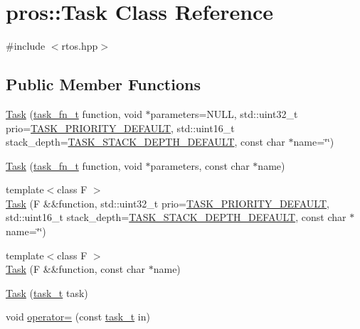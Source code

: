 \hypertarget{classpros_1_1Task}{}\section{pros\+:\+:Task Class Reference}
\label{classpros_1_1Task}


{\ttfamily \#include $<$rtos.\+hpp$>$}

\subsection*{Public Member Functions}
\begin{DoxyCompactItemize}
\item 
\hyperlink{classpros_1_1Task_a938ee60b49f29d743315bf05ee9f4a56}{Task} (\hyperlink{rtos_8h_aece0aa29b1f1538115228d2197239f98}{task\+\_\+fn\+\_\+t} function, void $\ast$parameters=N\+U\+LL, std\+::uint32\+\_\+t prio=\hyperlink{rtos_8h_a3082a7e8f15691441dba683711bb823f}{T\+A\+S\+K\+\_\+\+P\+R\+I\+O\+R\+I\+T\+Y\+\_\+\+D\+E\+F\+A\+U\+LT}, std\+::uint16\+\_\+t stack\+\_\+depth=\hyperlink{rtos_8h_a9ffb33b9e3714ca949d9f45dde3cbf8f}{T\+A\+S\+K\+\_\+\+S\+T\+A\+C\+K\+\_\+\+D\+E\+P\+T\+H\+\_\+\+D\+E\+F\+A\+U\+LT}, const char $\ast$name=\char`\"{}\char`\"{})
\item 
\hyperlink{classpros_1_1Task_a64608b28832c40cf11ddb350a7331a08}{Task} (\hyperlink{rtos_8h_aece0aa29b1f1538115228d2197239f98}{task\+\_\+fn\+\_\+t} function, void $\ast$parameters, const char $\ast$name)
\item 
{\footnotesize template$<$class F $>$ }\\\hyperlink{classpros_1_1Task_a6574af1a29f3031904fc75bf67563c00}{Task} (F \&\&function, std\+::uint32\+\_\+t prio=\hyperlink{rtos_8h_a3082a7e8f15691441dba683711bb823f}{T\+A\+S\+K\+\_\+\+P\+R\+I\+O\+R\+I\+T\+Y\+\_\+\+D\+E\+F\+A\+U\+LT}, std\+::uint16\+\_\+t stack\+\_\+depth=\hyperlink{rtos_8h_a9ffb33b9e3714ca949d9f45dde3cbf8f}{T\+A\+S\+K\+\_\+\+S\+T\+A\+C\+K\+\_\+\+D\+E\+P\+T\+H\+\_\+\+D\+E\+F\+A\+U\+LT}, const char $\ast$name=\char`\"{}\char`\"{})
\item 
{\footnotesize template$<$class F $>$ }\\\hyperlink{classpros_1_1Task_ada7a776e565ab35ebe4737747cca9926}{Task} (F \&\&function, const char $\ast$name)
\item 
\hyperlink{classpros_1_1Task_a0b37b46942f1ba25513729b15a32e12f}{Task} (\hyperlink{rtos_8h_a1d7e0825b8d8876e8cd8ece3f9115293}{task\+\_\+t} task)
\item 
void \hyperlink{classpros_1_1Task_aaaeae2788114241e149317248998781e}{operator=} (const \hyperlink{rtos_8h_a1d7e0825b8d8876e8cd8ece3f9115293}{task\+\_\+t} in)

\end{DoxyCompactItemize}
